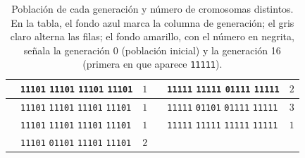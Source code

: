 \begin{table}[H]
\begin{tabular}{|c|l|c|c|l|c|}
\hline
\cellcolor{iteracion}{\bfseries\boldmath $7$} & \cellcolor{cebra}\texttt{11101} \texttt{11101} \texttt{11101} \texttt{11101} & \cellcolor{cebra}$1$ & \cellcolor{iteracion}{\bfseries\boldmath $18$} & \cellcolor{cebra}\texttt{11111} \texttt{11111} \texttt{01111} \texttt{11111} & \cellcolor{cebra}$2$ \\
\hline
\cellcolor{iteracion}{\bfseries\boldmath $8$} & \texttt{11101} \texttt{11101} \texttt{11101} \texttt{11101} & $1$ & \cellcolor{iteracion}{\bfseries\boldmath $19$} & \texttt{11111} \texttt{01101} \texttt{01111} \texttt{11111} & $3$ \\
\hline
\cellcolor{iteracion}{\bfseries\boldmath $9$} & \cellcolor{cebra}\texttt{11101} \texttt{11101} \texttt{11101} \texttt{11101} & \cellcolor{cebra}$1$ & \cellcolor{iteracion}{\bfseries\boldmath $20$} & \cellcolor{cebra}\texttt{11111} \texttt{11111} \texttt{11111} \texttt{11111} & \cellcolor{cebra}$1$ \\
\hline
\cellcolor{iteracion}{\bfseries\boldmath $10$} & \texttt{11101} \texttt{01101} \texttt{11101} \texttt{11101} & $2$ &  &  &  \\
\hline
\end{tabular}
\caption{Población de cada generación y número de cromosomas distintos. En la tabla, el fondo azul marca la columna de generación; el gris claro alterna las filas; el fondo amarillo, con el número en negrita, señala la generación 0 (población inicial) y la generación 16 (primera en que aparece \texttt{11111}).}
\label{tab:p1b-poblaciones}
\end{table}
